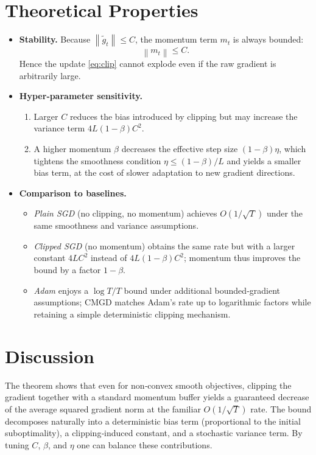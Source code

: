 \documentclass{article}
\newcommand{\norm}[1]{\left\lVert#1\right\rVert}
\begin{document}
\section*{Theoretical Properties}
\begin{itemize}
\item \textbf{Stability.} Because $\norm{\tilde g_t}\le C$, the momentum term $m_t$ is
always bounded:
\[
\norm{m_t}\le C.
\]
Hence the update \eqref{eq:clip} cannot explode even if the raw gradient is
arbitrarily large.

\item \textbf{Hyper‑parameter sensitivity.}
\begin{enumerate}
\item Larger $C$ reduces the bias introduced by clipping but may increase the
variance term $4L(1-\beta)C^2$.
\item A higher momentum $\beta$ decreases the effective step size
$(1-\beta)\eta$, which tightens the smoothness condition $\eta\le(1-\beta)/L$
and yields a smaller bias term, at the cost of slower adaptation to new
gradient directions.
\end{enumerate}

\item \textbf{Comparison to baselines.}
\begin{itemize}
\item \emph{Plain SGD} (no clipping, no momentum) achieves $O(1/\sqrt{T})$ under the
same smoothness and variance assumptions.
\item \emph{Clipped SGD} (no momentum) obtains the same rate but with a larger constant
$4LC^2$ instead of $4L(1-\beta)C^2$; momentum thus improves the bound by a factor
$1-\beta$.
\item \emph{Adam} enjoys a $\log T/T$ bound under additional bounded‑gradient
assumptions; CMGD matches Adam’s rate up to logarithmic factors while retaining
a simple deterministic clipping mechanism.
\end{itemize}
\end{itemize}

\section*{Discussion}
The theorem shows that even for non‑convex smooth objectives, clipping the
gradient together with a standard momentum buffer yields a guaranteed
decrease of the average squared gradient norm at the familiar $O(1/\sqrt{T})$
rate. The bound decomposes naturally into a deterministic bias term
(proportional to the initial suboptimality), a clipping‑induced constant,
and a stochastic variance term. By tuning $C$, $\beta$, and $\eta$ one can
balance these contributions.
\end{document}

